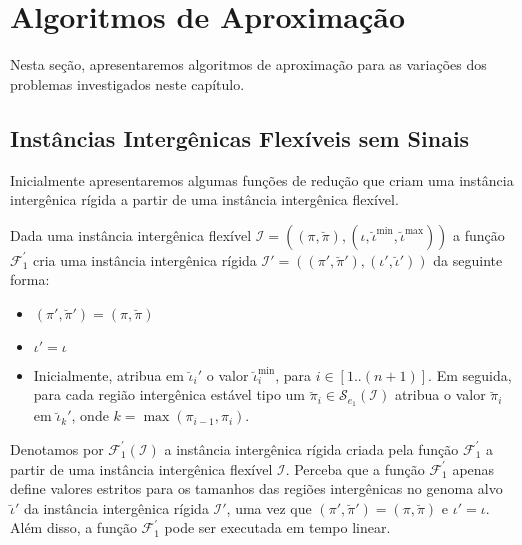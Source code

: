 \section{Algoritmos de Aproximação}

Nesta seção, apresentaremos algoritmos de aproximação para as variações dos problemas investigados neste capítulo.

\subsection{Instâncias Intergênicas Flexíveis sem Sinais}

Inicialmente apresentaremos algumas funções de redução que criam uma instância intergênica rígida a partir de uma instância intergênica flexível.

Dada uma instância intergênica flexível $\mathcal{I} = ((\pi,\breve\pi),(\iota,\breve\iota^{\min},\breve\iota^{\max}))$ a função $\mathcal{F}_{1}^{'}$ cria uma instância intergênica rígida $\mathcal{I'} = ((\pi',\breve\pi'),(\iota',\breve\iota'))$ da seguinte forma:

\begin{itemize}
  \item $(\pi',\breve\pi') = (\pi,\breve\pi)$
  \item $\iota' = \iota$
  \item Inicialmente, atribua em $\breve\iota_{i}'$ o valor $\breve\iota^{\min}_i$, para $i \in [1..({n+1})]$. Em seguida, para cada região intergênica estável tipo um $\breve\pi_i \in \mathcal{S}_{e_{1}}(\mathcal{I})$ atribua o valor $\breve\pi_i$ em $\breve\iota_{k}'$, onde $k = \max(\pi_{i-1},\pi_i)$.
\end{itemize}

Denotamos por $\mathcal{F}_{1}^{'}(\mathcal{I})$ a instância intergênica rígida criada pela função $\mathcal{F}_{1}^{'}$ a partir de uma instância intergênica flexível $\mathcal{I}$. Perceba que a função $\mathcal{F}_{1}^{'}$ apenas define valores estritos para os tamanhos das regiões intergênicas no genoma alvo $\breve\iota'$ da instância intergênica rígida $\mathcal{I'}$, uma vez que $(\pi',\breve\pi') = (\pi,\breve\pi)$ e $\iota' = \iota$. Além disso, a função $\mathcal{F}_{1}^{'}$ pode ser executada em tempo linear.

